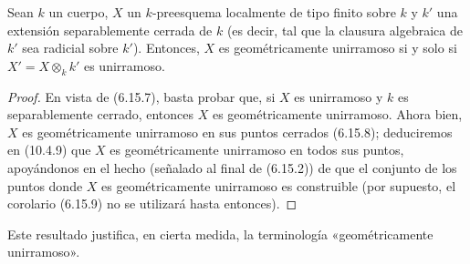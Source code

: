 \begin{corollary}[6.15.9]
\label{IV.2.s6.15.9-fr}
Sean $k$ un cuerpo, $X$ un $k$-preesquema localmente de
tipo finito sobre $k$ y $k'$ una extensión separablemente
cerrada de $k$ \textup{(es decir, tal que la clausura algebraica de
$k'$ sea radicial sobre $k'$)}. Entonces, $X$ es
geométricamente unirramoso si y solo si
$X'=X\otimes_k k'$ es unirramoso.
\end{corollary}

\begin{proof}
En vista de (6.15.7), basta probar que, si $X$ es unirramoso
y $k$ es separablemente cerrado, entonces $X$ es
geométricamente unirramoso. Ahora bien, $X$ es
geométricamente unirramoso en sus puntos cerrados (6.15.8);
deduciremos en (10.4.9) que $X$ es geométricamente unirramoso
en todos sus puntos, apoyándonos en el hecho (señalado al
final de (6.15.2)) de que el conjunto de los puntos donde
$X$ es geométricamente unirramoso es construible (por
supuesto, el corolario (6.15.9) no se utilizará hasta
entonces).
\end{proof}

Este resultado justifica, en cierta medida, la terminología
«geométricamente unirramoso».
